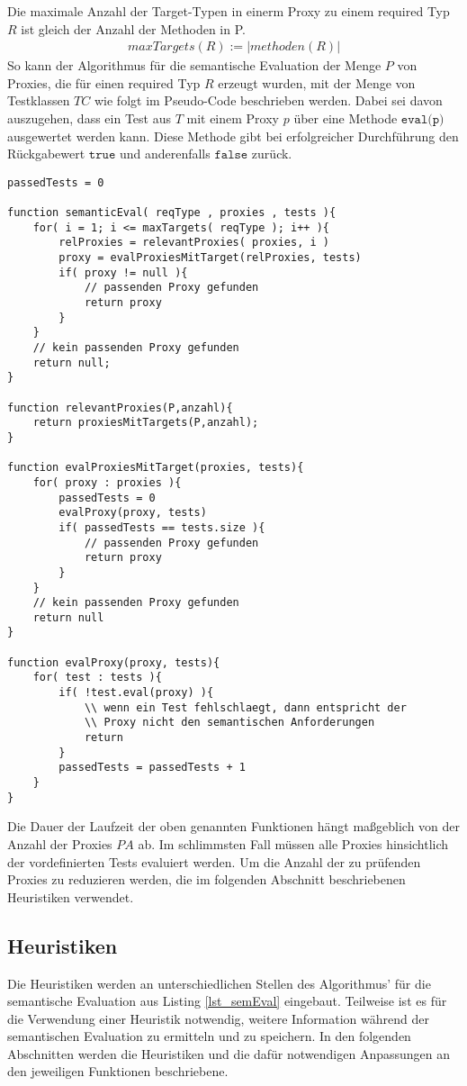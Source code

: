 \documentclass[a4paper,12pt]{article}
\begin{document}
Die maximale Anzahl der Target-Typen in einerm Proxy zu einem required Typ $R$ ist gleich der Anzahl der Methoden in P.
\begin{gather*}
maxTargets(R) := |\mathit{methoden(R)}|
\end{gather*}
\noindent
So kann der Algorithmus für die semantische Evaluation der Menge $P$ von Proxies, die für einen required Typ $R$ erzeugt wurden, mit der Menge von Testklassen $TC$ wie folgt im Pseudo-Code beschrieben werden. Dabei sei davon auszugehen, dass ein Test aus $T$ mit einem Proxy $p$ über eine Methode $\texttt{eval(p)}$ ausgewertet werden kann. Diese Methode gibt bei erfolgreicher Durchführung den Rückgabewert $\texttt{true}$ und anderenfalls $\texttt{false}$ zurück.
\begin{lstlisting}[style = pseudo, caption = Semantische Evaluation ohne Heuristiken, captionpos = b, label = lst_semEval]
passedTests = 0

function semanticEval( reqType , proxies , tests ){
	for( i = 1; i <= maxTargets( reqType ); i++ ){
		relProxies = relevantProxies( proxies, i )
		proxy = evalProxiesMitTarget(relProxies, tests)	
		if( proxy != null ){
			// passenden Proxy gefunden
			return proxy
		}
	}
	// kein passenden Proxy gefunden
	return null;
}

function relevantProxies(P,anzahl){
	return proxiesMitTargets(P,anzahl);
}

function evalProxiesMitTarget(proxies, tests){
	for( proxy : proxies ){
		passedTests = 0
		evalProxy(proxy, tests)
		if( passedTests == tests.size ){
			// passenden Proxy gefunden
			return proxy
		}
	}
	// kein passenden Proxy gefunden
	return null
}

function evalProxy(proxy, tests){
	for( test : tests ){
		if( !test.eval(proxy) ){
			\\ wenn ein Test fehlschlaegt, dann entspricht der 
			\\ Proxy nicht den semantischen Anforderungen
			return
		}
		passedTests = passedTests + 1
	}
}
\end{lstlisting}
Die Dauer der Laufzeit der oben genannten Funktionen hängt maßgeblich von der Anzahl der Proxies $\mathit{PA}$ ab. Im schlimmsten Fall müssen alle Proxies hinsichtlich der vordefinierten Tests evaluiert werden. Um die Anzahl der zu prüfenden Proxies zu reduzieren werden, die im folgenden Abschnitt beschriebenen Heuristiken verwendet.

\subsection{Heuristiken}
Die Heuristiken werden an unterschiedlichen Stellen des Algorithmus' für die semantische Evaluation aus Listing \ref{lst_semEval} eingebaut. Teilweise ist es für die Verwendung einer Heuristik notwendig, weitere Information während der semantischen Evaluation zu ermitteln und zu speichern. In den folgenden Abschnitten werden die Heuristiken und die dafür notwendigen Anpassungen an den jeweiligen Funktionen beschriebene.
\end{document}
